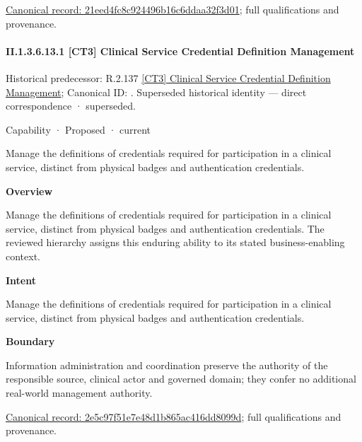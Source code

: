 {\footnotesize \href{../../../../../../../continuum/strategy/capability/21eed4fc8c924496b16c6ddaa32f3d01.md}{Canonical record: 21eed4fc8c924496b16c6ddaa32f3d01}; full qualifications and provenance.}\par
\paragraph*{II.1.3.6.13.1 [CT3] Clinical Service Credential Definition Management}
\label{navigation:II.1.3.6.13.1}

{\small Historical predecessor: R.2.137 \hyperref[element:0115ed50867d468a95c0fafa1c5d79e2]{[CT3] Clinical Service Credential Definition Management}; Canonical ID: \texttt{}. Superseded historical identity — direct correspondence · superseded.}\par
\label{element:2e5c97f51e7e48d1b865ac416dd8099d}
{\small Capability · Proposed · current}\par

Manage the definitions of credentials required for participation in a clinical service, distinct from physical badges and authentication credentials.



\textbf{Overview}



Manage the definitions of credentials required for participation in a clinical service, distinct from physical badges and authentication credentials. The reviewed hierarchy assigns this enduring ability to its stated business-enabling context.



\textbf{Intent}



Manage the definitions of credentials required for participation in a clinical service, distinct from physical badges and authentication credentials.



\textbf{Boundary}



Information administration and coordination preserve the authority of the responsible source, clinical actor and governed domain; they confer no additional real-world management authority.


{\footnotesize \href{../../../../../../../continuum/strategy/capability/2e5c97f51e7e48d1b865ac416dd8099d.md}{Canonical record: 2e5c97f51e7e48d1b865ac416dd8099d}; full qualifications and provenance.}\par
